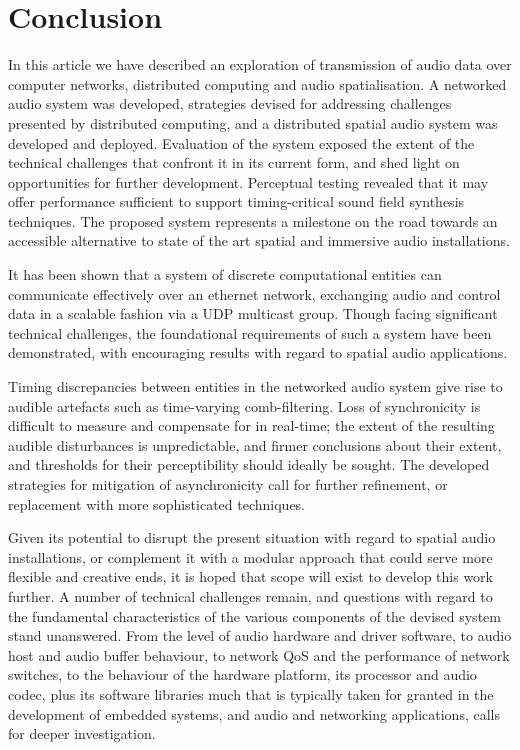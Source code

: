 \section{Conclusion}\label{sec:conclusion}

In this article we have described an exploration of transmission of audio data
over computer networks, distributed computing and audio spatialisation.
A networked audio system was developed, strategies devised for
addressing challenges presented by distributed computing, and a distributed
spatial audio system was developed and deployed.
Evaluation of the system exposed the extent of the technical challenges
that confront it in its current form, and shed light on opportunities for
further development.
Perceptual testing revealed that it may offer performance sufficient to support
timing-critical sound field synthesis techniques.
The proposed system represents a milestone on the road towards an accessible
alternative to state of the art spatial and immersive audio installations.

It has been shown that a system of discrete computational entities can
communicate effectively over an ethernet network, exchanging audio and control
data in a scalable fashion via a UDP multicast group.
Though facing significant technical challenges, the foundational requirements of
such a system have been demonstrated, with encouraging results with regard to
spatial audio applications.

Timing discrepancies between entities in the networked audio system give rise
to audible artefacts such as time-varying comb-filtering.
Loss of synchronicity is difficult to measure and compensate for in real-time;
the extent of the resulting audible disturbances is unpredictable, and firmer
conclusions about their extent, and thresholds for their perceptibility should
ideally be sought.
The developed strategies for mitigation of asynchronicity call for further
refinement, or replacement with more sophisticated techniques.

Given its potential to disrupt the present situation with regard to spatial
audio installations, or complement it with a modular approach that could serve
more flexible and creative ends, it is hoped that scope will exist to develop
this work further.
A number of technical challenges remain, and questions with regard to the
fundamental characteristics of the various components of the devised system
stand unanswered.
From the level of audio hardware and driver software, to audio host and audio
buffer behaviour, to network QoS and the performance of network switches, to
the behaviour of the hardware platform, its processor and audio codec, plus its
software libraries \textemdash{} much that is typically taken for granted in the
development of embedded systems, and audio and networking applications, calls
for deeper investigation.

